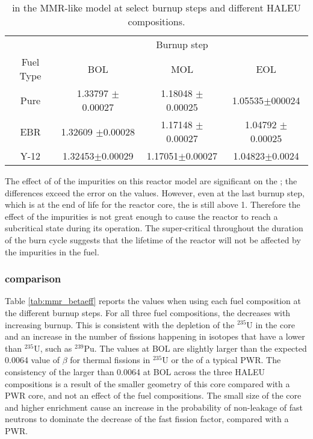 \begin{table}[ht]
        \centering
        \caption{\keff in the \gls{MMR}-like model at select burnup 
        steps and different \gls{HALEU} compositions.}
        \label{tab:mmr_keff}
        \begin{tabular}{c c c c}
                \hline 
                & \multicolumn{3}{c}{Burnup step}\\
                Fuel Type & \gls{BOL} & \gls{MOL} & \gls{EOL} \\
                \hline 
                Pure & 1.33797 $\pm$ 0.00027 & 1.18048 $\pm$ 0.00025 & 1.05535$\pm$000024\\
                \gls{EBR} & 1.32609 $\pm$0.00028 & 1.17148 $\pm$ 0.00027 & 1.04792 $\pm$ 0.00025 \\
                Y-12 & 1.32453$\pm$0.00029 & 1.17051$\pm$0.00027 & 1.04823$\pm$0.0024\\
                \hline
                
        \end{tabular}
\end{table}

The effect of of the impurities on this reactor model are significant on the 
\keff; the differences exceed the error on the values. However, 
even at the last burnup step, which is at the end of life for the reactor 
core, the \keff is still above 1. Therefore the effect of the impurities 
is not great enough to cause the reactor to reach a subcritical state 
during its operation. The super-critical \keff throughout the duration 
of the burn cycle suggests that the lifetime of the reactor will not be 
affected by the impurities in the fuel.

\subsubsection{\betaEff comparison}
Table \ref{tab:mmr_betaeff} reports the \betaEff values when using 
each fuel composition at the different burnup steps. For all three 
fuel compositions, the \betaEff decreases with increasing burnup. This 
is consistent with the depletion of the $^{235}$U in the core and 
an increase in the number of fissions happening in isotopes
that have a lower \betaEff than $^{235}$U, such as $^{239}$Pu. 
The \betaEff values at \gls{BOL} are slightly larger 
than the expected 0.0064 value of $\beta$ for thermal fissions in $^{235}$U
or the \betaEff of a typical \gls{PWR}. The consistency of the \betaEff 
larger than 0.0064 at \gls{BOL} across the three \gls{HALEU} compositions 
is a result of the smaller geometry of this core compared with a 
\gls{PWR} core, and not an effect of the fuel compositions. 
The small size of the core and higher enrichment cause an 
increase in the probability of non-leakage of fast neutrons to 
dominate the decrease of the fast fission factor, compared with a \gls{PWR}. 


